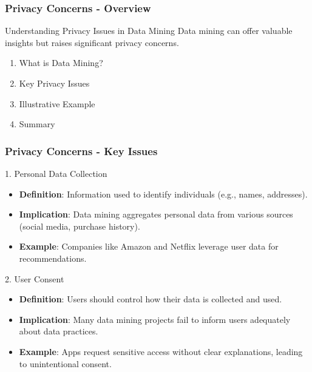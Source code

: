 \documentclass{beamer}
\begin{document}
\begin{frame}[fragile]
    \frametitle{Privacy Concerns - Overview}
    \begin{block}{Understanding Privacy Issues in Data Mining}
        Data mining can offer valuable insights but raises significant privacy concerns.
    \end{block}
    
    \begin{enumerate}
        \item What is Data Mining?
        \item Key Privacy Issues
        \item Illustrative Example
        \item Summary
    \end{enumerate}
\end{frame}

\begin{frame}[fragile]
    \frametitle{Privacy Concerns - Key Issues}
    
    \begin{block}{1. Personal Data Collection}
        \begin{itemize}
            \item \textbf{Definition}: Information used to identify individuals (e.g., names, addresses).
            \item \textbf{Implication}: Data mining aggregates personal data from various sources (social media, purchase history).
            \item \textbf{Example}: Companies like Amazon and Netflix leverage user data for recommendations.
        \end{itemize}
    \end{block}


    \begin{block}{2. User Consent}
        \begin{itemize}
            \item \textbf{Definition}: Users should control how their data is collected and used.
            \item \textbf{Implication}: Many data mining projects fail to inform users adequately about data practices.
            \item \textbf{Example}: Apps request sensitive access without clear explanations, leading to unintentional consent.
        \end{itemize}
    \end{block}
\end{frame}
\end{document}

